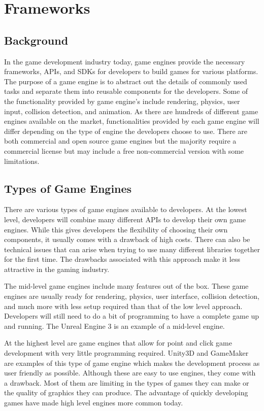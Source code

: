 \section{Frameworks}

\subsection{Background}
In the game development industry today, game engines provide the necessary frameworks, APIs, and SDKs for developers to build games for various platforms. The purpose of a game engine is to abstract out the details of commonly used tasks and separate them into reusable components for the developers. Some of the functionality provided by game engine's include rendering, physics, user input, collision detection, and animation. As there are hundreds of different game engines available on the market, functionalities provided by each game engine will differ depending on the type of engine the developers choose to use. There are both commercial and open source game engines but the majority require a commercial license but may include a free non-commercial version with some limitations.

\subsection{Types of Game Engines}
There are various types of game engines available to developers. At the lowest level, developers will combine many different APIs to develop their own game engines. While this gives developers the flexibility of choosing their own components, it usually comes with a drawback of high costs. There can also be technical issues that can arise when trying to use many different libraries together for the first time. The drawbacks associated with this approach make it less attractive in the gaming industry.

The mid-level game engines include many features out of the box. These game engines are usually ready for rendering, physics, user interface, collision detection, and much more with less setup required than that of the low level approach. Developers will still need to do a bit of programming to have a complete game up and running. The Unreal Engine 3 is an example of a mid-level engine.

At the highest level are game engines that allow for point and click game development with very little programming required. Unity3D and GameMaker are examples of this type of game engine which makes the development process as user friendly as possible. Although these are easy to use engines, they come with a drawback. Most of them are limiting in the types of games they can make or the quality of graphics they can produce. The advantage of quickly developing games have made high level engines more common today.
 
